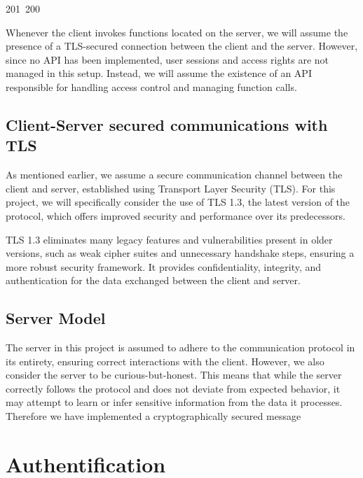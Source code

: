 201~200~\documentclass{article}
\begin{document}
	                                                                Whenever the client invokes functions located on the server, we will assume the presence of a TLS-secured connection between the client and the server. However, since no API has been implemented, user sessions and access rights are not managed in this setup. Instead, we will assume the existence of an API responsible for handling access control and managing function calls.

	                                                                \subsection{Client-Server secured communications with TLS}

	                                                                As mentioned earlier, we assume a secure communication channel between the client and server, established using Transport Layer Security (TLS). For this project, we will specifically consider the use of TLS 1.3, the latest version of the protocol, which offers improved security and performance over its predecessors.

	                                                                TLS 1.3 eliminates many legacy features and vulnerabilities present in older versions, such as weak cipher suites and unnecessary handshake steps, ensuring a more robust security framework. It provides confidentiality, integrity, and authentication for the data exchanged between the client and server.

	                                                                \subsection{Server Model}
	                                                                The server in this project is assumed to adhere to the communication protocol in its entirety, ensuring correct interactions with the client. However, we also consider the server to be curious-but-honest. This means that while the server correctly follows the protocol and does not deviate from expected behavior, it may attempt to learn or infer sensitive information from the data it processes. Therefore we have implemented a cryptographically secured message  

	                                                                \clearpage
	                                                                \section{Authentification}
\end{document}
